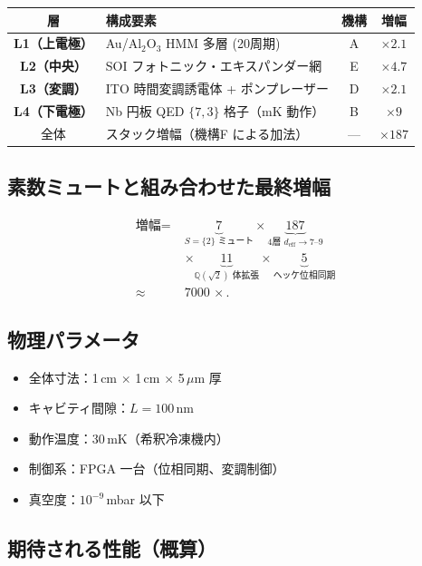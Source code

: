 \documentclass[11pt,a4paper]{article}
\newcommand{\deff}{d_{\mathrm{eff}}}
\begin{document}
\begin{center}
\begin{tabular}{c|l|c|c}
\toprule
層 & 構成要素 & 機構 & 増幅 \\
\midrule
\textbf{L1（上電極）} & Au/Al$_2$O$_3$ HMM 多層 (20周期) & A & $\times 2.1$ \\
\textbf{L2（中央）}   & SOI フォトニック・エキスパンダー網 & E & $\times 4.7$ \\
\textbf{L3（変調）}   & ITO 時間変調誘電体 + ポンプレーザー & D & $\times 2.1$ \\
\textbf{L4（下電極）} & Nb 円板 QED $\{7,3\}$ 格子（mK 動作） & B & $\times 9$ \\
\midrule
全体 & スタック増幅（機構F による加法） & — & $\times 187$ \\
\bottomrule
\end{tabular}
\end{center}

\subsection{素数ミュートと組み合わせた最終増幅}

\begin{align*}
\text{増幅} = \;& \underbrace{7}_{S=\{2\}\text{ ミュート}}
              \times \underbrace{187}_{\text{4層 } \deff\to 7\text{--}9} \\
              & \times \underbrace{11}_{\mathbb{Q}(\sqrt 2)\text{ 体拡張}}
              \times \underbrace{5}_{\text{ヘッケ位相同期}}\\[0.5em]
              \approx \;& 7000\,\times.
\end{align*}

\subsection{物理パラメータ}

\begin{itemize}[leftmargin=2em]
  \item 全体寸法：1\,cm $\times$ 1\,cm $\times$ 5\,$\mu$m 厚
  \item キャビティ間隙：$L = 100$\,nm
  \item 動作温度：30\,mK（希釈冷凍機内）
  \item 制御系：FPGA 一台（位相同期、変調制御）
  \item 真空度：$10^{-9}$\,mbar 以下
\end{itemize}

\subsection{期待される性能（概算）}
\end{document}
